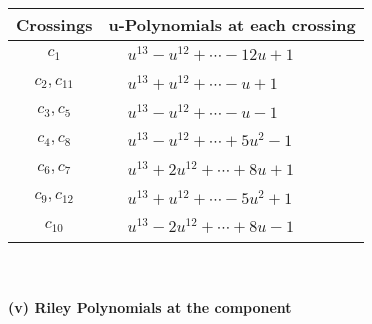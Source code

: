\documentclass[1p]{elsarticle_modified}
\theoremstyle{definition}
\begin{document}
\begin{tabular}{m{50pt}|m{274pt}}
Crossings & \hspace{64pt}u-Polynomials at each crossing \\
\hline $$\begin{aligned}c_{1}\end{aligned}$$&$\begin{aligned}
&u^{13}- u^{12}+\cdots-12 u+1
\end{aligned}$\\
\hline $$\begin{aligned}c_{2},c_{11}\end{aligned}$$&$\begin{aligned}
&u^{13}+u^{12}+\cdots- u+1
\end{aligned}$\\
\hline $$\begin{aligned}c_{3},c_{5}\end{aligned}$$&$\begin{aligned}
&u^{13}- u^{12}+\cdots- u-1
\end{aligned}$\\
\hline $$\begin{aligned}c_{4},c_{8}\end{aligned}$$&$\begin{aligned}
&u^{13}- u^{12}+\cdots+5 u^2-1
\end{aligned}$\\
\hline $$\begin{aligned}c_{6},c_{7}\end{aligned}$$&$\begin{aligned}
&u^{13}+2 u^{12}+\cdots+8 u+1
\end{aligned}$\\
\hline $$\begin{aligned}c_{9},c_{12}\end{aligned}$$&$\begin{aligned}
&u^{13}+u^{12}+\cdots-5 u^2+1
\end{aligned}$\\
\hline $$\begin{aligned}c_{10}\end{aligned}$$&$\begin{aligned}
&u^{13}-2 u^{12}+\cdots+8 u-1
\end{aligned}$\\
\hline
\end{tabular}\\~\\
\newpage\renewcommand{\arraystretch}{1}
\flushleft \textbf{(v) Riley Polynomials at the component}\newline \\
\end{document}
